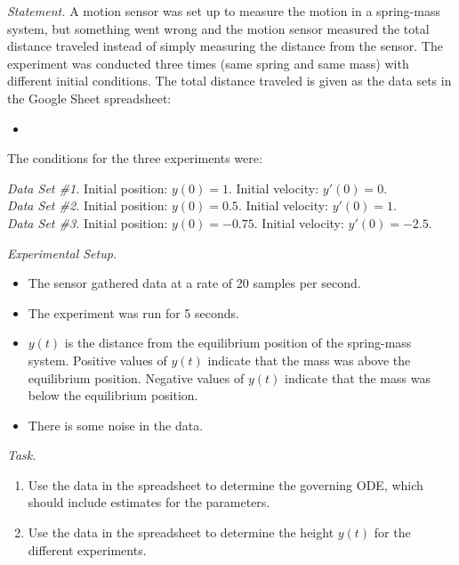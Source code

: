 \emph{Statement. } 
A motion sensor was set up to measure the motion in a spring-mass system, but something went wrong and the motion sensor measured the total distance traveled instead of simply measuring the distance from the sensor. The experiment was conducted three times (same spring and same mass) with different initial conditions. The total distance traveled is given as the data sets in the Google Sheet spreadsheet:
\begin{graybox}
\begin{itemize}
	\item {}
\end{itemize}
\end{graybox}


The conditions for the three experiments were:

\emph{Data Set \#1.} Initial position: $y(0) = 1$. Initial velocity: $y'(0) = 0$.	 \\
\emph{Data Set \#2.} Initial position: $y(0) = 0.5$. Initial velocity: $y'(0) = 1$. \\	
\emph{Data Set \#3.} Initial position: $y(0) = -0.75$. Initial velocity: $y'(0) = -2.5$.	\\


\vfill

\emph{Experimental Setup.}

\begin{itemize}
	\item The sensor gathered data at a rate of 20 samples per second.
	\item The experiment was run for 5 seconds.
	\item $y(t)$ is the distance from the equilibrium position of the spring-mass system. Positive values of $y(t)$ indicate that the mass was above the equilibrium position. Negative values of $y(t)$ indicate that the mass was below the equilibrium position.
	\item There is some noise in the data.
\end{itemize}

\vfill

\emph{Task. } 

\begin{enumerate}[label=\emph{\arabic*.}]
	\item Use the data in the spreadsheet to determine the governing ODE, which should include estimates for the parameters.
	\item Use the data in the spreadsheet to determine the height $y(t)$ for the different experiments.
\end{enumerate}


